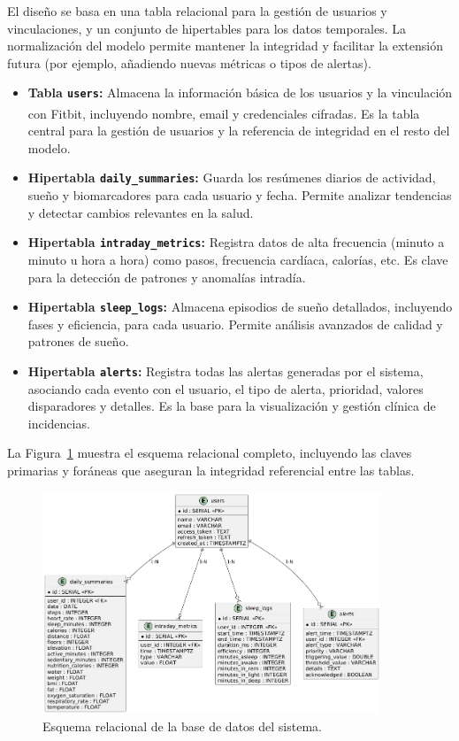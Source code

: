 El diseño se basa en una tabla relacional para la gestión de usuarios y vinculaciones, y un conjunto de hipertables para los datos temporales. La normalización del modelo permite mantener la integridad y facilitar la extensión futura (por ejemplo, añadiendo nuevas métricas o tipos de alertas).

\begin{itemize}
    \item \textbf{Tabla \texttt{users}:} Almacena la información básica de los usuarios y la vinculación con Fitbit\textsuperscript{\textregistered}, incluyendo nombre, email y credenciales cifradas. Es la tabla central para la gestión de usuarios y la referencia de integridad en el resto del modelo.
    \item \textbf{Hipertabla \texttt{daily\_summaries}:} Guarda los resúmenes diarios de actividad, sueño y biomarcadores para cada usuario y fecha. Permite analizar tendencias y detectar cambios relevantes en la salud.
    \item \textbf{Hipertabla \texttt{intraday\_metrics}:} Registra datos de alta frecuencia (minuto a minuto u hora a hora) como pasos, frecuencia cardíaca, calorías, etc. Es clave para la detección de patrones y anomalías intradía.
    \item \textbf{Hipertabla \texttt{sleep\_logs}:} Almacena episodios de sueño detallados, incluyendo fases y eficiencia, para cada usuario. Permite análisis avanzados de calidad y patrones de sueño.
    \item \textbf{Hipertabla \texttt{alerts}:} Registra todas las alertas generadas por el sistema, asociando cada evento con el usuario, el tipo de alerta, prioridad, valores disparadores y detalles. Es la base para la visualización y gestión clínica de incidencias.
\end{itemize}

La Figura~\ref{fig:esquema_relacional} muestra el esquema relacional completo, incluyendo las claves primarias y foráneas que aseguran la integridad referencial entre las tablas.

\begin{figure}[htbp]
    \centering
    \includegraphics[width=0.9\textwidth]{imagenes/esquema_relacional.png}
    \caption{Esquema relacional de la base de datos del sistema.}
    \label{fig:esquema_relacional}
\end{figure}

